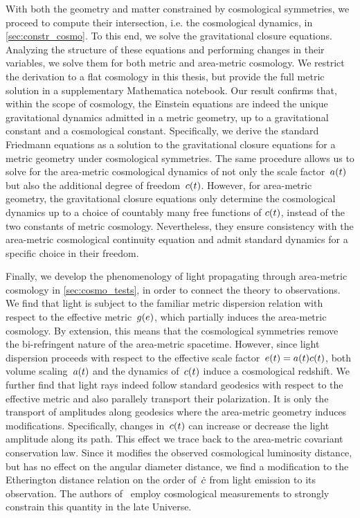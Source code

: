With both the geometry and matter constrained by cosmological symmetries, we proceed to compute their intersection, i.e. the cosmological dynamics, in \autoref{sec:constr_cosmo}. To this end, we solve the gravitational closure equations. Analyzing the structure of these equations and performing changes in their variables, we solve them for both metric and area-metric cosmology. We restrict the derivation to a flat cosmology in this thesis, but provide the full metric solution in a supplementary Mathematica notebook. Our result confirms that, within the scope of cosmology, the Einstein equations are indeed the unique gravitational dynamics admitted in a metric geometry, up to a gravitational constant and a cosmological constant. Specifically, we derive the standard Friedmann equations as a solution to the gravitational closure equations for a metric geometry under cosmological symmetries. The same procedure allows us to solve for the area-metric cosmological dynamics of not only the scale factor~$a(t)$ but also the additional degree of freedom~$c(t)$. However, for area-metric geometry, the gravitational closure equations only determine the cosmological dynamics up to a choice of countably many free functions of $c(t)$, instead of the two  constants of metric cosmology. Nevertheless, they ensure consistency with the area-metric cosmological continuity equation and admit standard \FLRW{} dynamics for a specific choice in their freedom.

Finally, we develop the phenomenology of light propagating through area-metric cosmology in \autoref{sec:cosmo_tests}, in order to connect the theory to observations. We find that light is subject to the familiar metric dispersion relation with respect to the effective \FLRW{} metric~$g(e)$, which partially induces the area-metric cosmology. By extension, this means that the cosmological symmetries remove the bi-refringent nature of the area-metric spacetime. However, since light dispersion proceeds with respect to the effective scale factor~${e(t)=a(t)c(t)}$, both volume scaling~$a(t)$ and the dynamics of~$c(t)$ induce a cosmological redshift. We further find that light rays indeed follow standard geodesics with respect to the effective \FLRW{} metric and also parallely transport their polarization. It is only the transport of amplitudes along geodesics where the area-metric geometry induces modifications. Specifically, changes in~$c(t)$ can increase or decrease the light amplitude along its path. This effect we trace back to the area-metric covariant conservation law. Since it modifies the observed cosmological luminosity distance, but has no effect on the angular diameter distance, we find a modification to the Etherington distance relation on the order of~$\dot{c}$ from light emission to its observation. The authors of~\autocite{EtheringtonBiref} employ cosmological measurements to strongly constrain this quantity in the late Universe.

